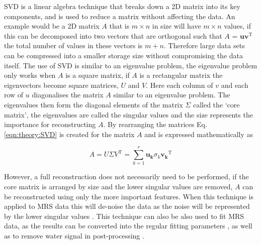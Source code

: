 \ac{SVD} is a linear algebra technique that breaks down a 2D matrix into its key components, and is used to reduce a matrix without affecting the data. An example would be a 2D matrix $A$ that is $m \times n$ in size will have $m \times n$ values, if this can be decomposed into two vectors that are orthogonal such that $A$ = $\mathbf{uv}^\textrm{T}$ the total number of values in these vectors is $m+n$. Therefore large data sets can be compressed into a smaller storage size without compromising the data itself. The use of \ac{SVD} is similar to an eigenvalue problem, the eigenvalue problem only works when $A$ is a square matrix, if $A$ is a rectangular matrix the eigenvectors become square matrices, $U$ and $V$. Here each column of $v$ and each row of $u$ diagonalises the matrix $A$ similar to an eigenvalue problem. The eigenvalues then form the diagonal elements of the matrix $\Sigma$ called the `core matrix', the eigenvalues are called the singular values and the size represents the importance for reconstructing $A$. By rearranging the matrices Eq. \ref{eqn:theory:SVD} is created for the matrix $A$ \cite{Strang2016TheDecomposition} and is expressed mathematically as


\begin{equation}
    A = U\Sigma V^\textrm{T} = \sum_{k=1}^{r} \mathbf{u_k}\sigma_k\mathbf{v_k}^\textrm{T}
    \label{eqn:theory:SVD}
\end{equation}

\noindent However, a full reconstruction does not necessarily need to be performed, if the core matrix is arranged by size and the lower singular values are removed, $A$ can be reconstructed using only the more important features. When this technique is applied to \ac{MRS} data this will de-noise the data as the noise will be represented by the lower singular values \cite{Brender2019DynamicHyperpolarization}. This technique can also be also used to fit \ac{MRS} data, as the results can be converted into the regular fitting parameters \cite{Pijnappel1992SVD-basedSignals}, as well as to remove water signal in post-processing \cite{Cabanes2001OptimizationBrain}.

